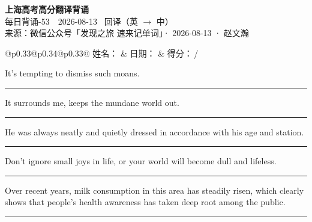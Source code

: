 \documentclass[11pt,a4paper]{article}
\newcommand{\num}[1]{\makebox[1.9em][r]{#1.}\hspace{0.3em}}
\newcommand{\wline}{\noindent\rule{\linewidth}{0.4pt}}
\begin{document}
\pagestyle{plain}
\begin{center}
{\LARGE\bfseries 上海高考高分翻译背诵 }\\[0.25em]
{\large 每日背诵-53　2026-08-13 \quad\ 回译（英 $\to$ 中）}\\[0.35em]
{\footnotesize 来源：微信公众号「发现之旅 速来记单词」· 2026-08-13 · 赵文瀚}
\end{center}

\vspace{0.4em}
\noindent\begin{tabular}{@{}p{0.33\textwidth}@{}p{0.34\textwidth}@{}p{0.33\textwidth}@{}}
姓名：\underline{\hspace{2.0cm}} & 日期：\underline{\hspace{2.0cm}} & 得分：\underline{\hspace{1.4cm}}\,/ \\
\end{tabular}

\vspace{0.5em}

\vspace{0.8em}
\num{1}It's tempting to dismiss such moans.

\vspace{0.25em}

\wline

\num{2}It surrounds me, keeps the mundane world out.

\vspace{0.25em}

\wline

\num{3}He was always neatly and quietly dressed in accordance with his age and station.

\vspace{0.25em}

\wline

\num{4}Don’t ignore small joys in life, or your world will become dull and lifeless.

\vspace{0.25em}

\wline

\num{5}Over recent years, milk consumption in this area has steadily risen, which clearly shows that people’s health awareness has taken deep root among the public.

\vspace{0.25em}

\wline
\end{document}
